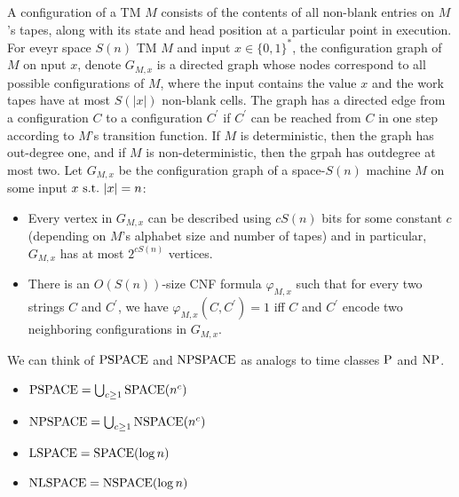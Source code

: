 \begin{note}
  A configuration of a TM $M$ consists of the contents of all non-blank
  entries on $M$'s tapes, along with its state and head position at a
  particular point in execution.
  For eveyr space $S(n)$ TM $M$ and input $x \in \{0, 1\}^\ast$, the
  configuration graph of $M$ on nput $x$, denote $G_{M, x}$ is a directed
  graph whose nodes correspond to all possible configurations of $M$, where
  the input contains the value $x$ and the work tapes have at most $S(|x|)$
  non-blank cells.
  The graph has a directed edge from a configuration $C$ to a configuration
  $C^\prime$ if $C^\prime$ can be reached from $C$ in one step according
  to $M$'s transition function.
  If $M$ is deterministic, then the graph has out-degree one, and if $M$
  is non-deterministic, then the grpah has outdegree at most two.
  Let $G_{M, x}$ be the configuration graph of a space-$S(n)$ machine $M$ on
  some input $x \mathrm{\ s.t.\ } |x| = n$:
  \begin{itemize}
    \item
      Every vertex in $G_{M, x}$ can be described using $cS(n)$ bits for some
      constant $c$ (depending on $M$'s alphabet size and number of tapes) and
      in particular, $G_{M, x}$ has at most $2^{cS(n)}$ vertices.

    \item
      There is an $O(S(n))$-size CNF formula $\varphi_{M, x}$ such that
      for every two strings $C$ and $C^\prime$, we have
      $\varphi_{M, x} (C, C^\prime) = 1$ iff $C$ and $C^\prime$ encode two
      neighboring configurations in $G_{M, x}$.
  \end{itemize}
\end{note}

\begin{note}
  We can think of $\mathrm{PSPACE}$ and $\mathrm{NPSPACE}$ as analogs to time
  classes $\mathrm{P}$ and $\mathrm{NP}$.

  \begin{itemize}
    \item
      $\mathrm{PSPACE} = \bigcup_{c \geq 1} \mathrm{SPACE}(n^c)$

    \item
      $\mathrm{NPSPACE} = \bigcup_{c \geq 1} \mathrm{NSPACE}(n^c)$

    \item
      $\mathrm{LSPACE} = \mathrm{SPACE}(\log n)$

    \item
      $\mathrm{NLSPACE} = \mathrm{NSPACE}(\log n)$
  \end{itemize}
\end{note}

